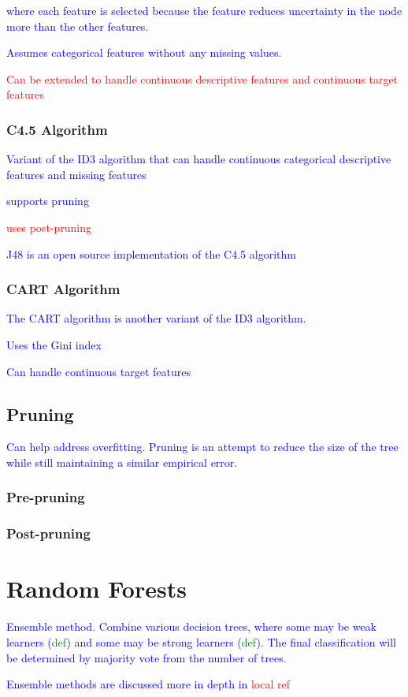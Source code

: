 \textcolor{blue}{where each feature is selected because the feature reduces uncertainty in the node more than the other features.}

\textcolor{blue}{Assumes categorical features without any missing values.}

\textcolor{red}{Can be extended to handle continuous descriptive features and continuous target features}

\subsubsection{C4.5 Algorithm}

\textcolor{blue}{Variant of the {ID3 algorithm} that can handle continuous categorical descriptive features and missing features}

\textcolor{blue}{supports pruning}

\textcolor{red}{uses post-pruning}

\textcolor{blue}{{J48} is an open source implementation of the C4.5 algorithm}

\subsubsection{CART Algorithm}

\textcolor{blue}{The CART algorithm is another variant of the ID3 algorithm.}

\textcolor{blue}{Uses the Gini index}

\textcolor{blue}{Can handle continuous target features}

\subsection{Pruning}

\textcolor{blue}{Can help address overfitting. Pruning is an attempt to reduce the size of the tree while still maintaining a similar empirical error.}

\subsubsection{Pre-pruning}

\subsubsection{Post-pruning}

\section{Random Forests}

\textcolor{blue}{Ensemble method. Combine various decision trees, where some may be weak learners (\textcolor{green}{def}) and some may be strong learners (\textcolor{green}{def}). The final classification will be determined by majority vote from the number of trees.}

\textcolor{blue}{Ensemble methods are discussed more in depth in \textcolor{red}{local ref}}



